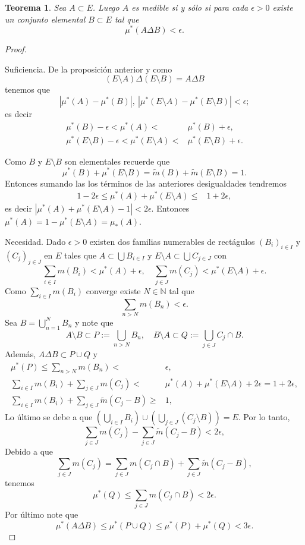 \documentclass[twoside,12pt,a4 paper,openright]{book}
\newtheorem{teo}[claim]{Teorema}
\begin{document}
\begin{teo}\label{teomedible}
Sea $A\subset E$. Luego  $A$ es medible  si y s\'olo si para cada $\epsilon >0$ existe un conjunto elemental $B\subset E$ tal que 
$$\mu^*(A\Delta B)<\epsilon.$$ 
\end{teo} 
\begin{proof}\ {}

\noindent
Suficiencia. De la proposici\'on anterior y como 
$$(E\setminus A )\Delta (E\setminus B) = A\Delta B$$    tenemos que 
$$  |\mu^*(A)- \mu^*(B)  | , \  |\mu^*(E\setminus  A)- \mu^*(E\setminus B)  | < \epsilon  ;$$
es decir 
\begin{align*}  \mu^*(B)  - \epsilon <  \mu^*(A)  < &  \mu^*(B)  + \epsilon ,\\
  \mu^*(E\setminus B)  - \epsilon < \mu^*(E\setminus  A)   <  &  \mu^*(E\setminus B)  + \epsilon .
  \end{align*}

Como $B$ y $E\setminus B$ son elementales recuerde que 
$$\mu^*(B)  + \mu^*(E\setminus B)= \tilde{m}(B) +\tilde{m}(E\setminus B) =1  . $$
Entonces  sumando las los t\'erminos  de las anteriores   desigualdades tendremos  
\begin{align*}  1 -2 \epsilon \leq   \mu^*(A)  +  \mu^*(E\setminus  A)   \leq &  1 + 2 \epsilon,
  \end{align*}
es decir  $ | \mu^*(A)  +  \mu^*(E\setminus  A) -1 | < 2\epsilon$. Entonces $ \mu^*(A) = 1-  \mu^*(E\setminus  A) = \mu_*(A) $.


\noindent
Necesidad. Dado $\epsilon >0$ existen dos familias numerables de rect\'agulos  $(B_i)_{i\in I}$ y $(C_j)_{j\in J}$ en $E$ tales que 
$A \subset \bigcup B_{i\in I}$ y $E\setminus A \subset \bigcup C_{j\in J} $ con 
 $$\sum_{i\in I} m(B_i) < \mu^* ( A) + \epsilon , \quad \sum_{j\in J} m(C_j) < \mu^* ( E\setminus A) + \epsilon  . $$
 Como $\displaystyle \sum_{i\in I} m(B_i)$ converge existe $N\in \mathbb N $ tal que 
 $$\sum_{n> N} m(B_n) <  \epsilon .$$
Sea $\displaystyle B= \bigcup_{n=1}^N  B_n $ y note que 
$$ A\setminus B \subset  P := \bigcup_{n> N}  B_n     , \quad   B\setminus A  \subset  Q:=  \bigcup_{j\in J}  C_j\cap B    .$$
Adem\'as, 
$A\Delta B \subset P\cup Q$ y 
\begin{align*}    \mu^* (P)  \leq \sum_{n> N} m(B_n) < &  \epsilon, \\
 \sum_{i\in I} m(B_i) + \sum_{j\in J} m(C_j)  < &  \mu^* ( A) +  \mu^* ( E\setminus A) + 2\epsilon = 1 + 2\epsilon, \\
  \sum_{i\in I} m(B_i) + \sum_{j\in J} \tilde{ m} (C_j- B) \geq & 1, 
\end{align*}
Lo \'ultimo se debe a que $\displaystyle (\bigcup_{i\in I} B_i )\cup (\bigcup_{j\in J} ( C_j\setminus B) ) =E$. 
 Por  lo tanto,  
$$
   \sum_{j\in J} m(C_j) -  \sum_{j\in J} \tilde{ m} (C_j- B)   <  2\epsilon,$$
 Debido a que $$  \sum_{j\in J} m(C_j) =  \sum_{j\in J} m(C_j\cap B) +   \sum_{j\in J} \tilde{ m} (C_j- B) , $$
 tenemos 
$$
\mu^*(Q)\leq     \sum_{j\in J} m(C_j\cap  B)   <  2\epsilon. $$
Por \'ultimo note que 
$$\mu^* (A\Delta B) \leq  \mu^* ( P\cup Q)\leq  \mu^* ( P) + \mu^* (   Q) < 3\epsilon.$$  


\end{proof}
\end{document}
